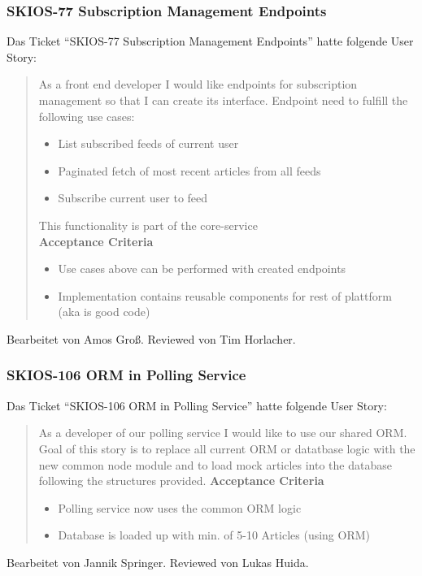 \subsubsection{SKIOS-77 Subscription Management Endpoints}
Das Ticket \enquote{SKIOS-77 Subscription Management Endpoints} hatte folgende User Story:
\begin{quotation}
    As a front end developer I would like endpoints for subscription management so that I can create its interface.
    Endpoint need to fulfill the following use cases:
    \begin{itemize}
        \item List subscribed feeds of current user
        \item Paginated fetch of most recent articles from all feeds
        \item Subscribe current user to feed
    \end{itemize}

    This functionality is part of the core-service \\

\textbf{Acceptance Criteria}
\begin{itemize}
    \item Use cases above can be performed with created endpoints
    \item Implementation contains reusable components for rest of plattform (aka is good code)
\end{itemize}
\end{quotation}
Bearbeitet von Amos Groß.
Reviewed von Tim Horlacher.

\subsubsection{SKIOS-106 ORM in Polling Service}
Das Ticket \enquote{SKIOS-106 ORM in Polling Service} hatte folgende User Story:
\begin{quotation}
    As a developer of our polling service I would like to use our shared ORM.
    Goal of this story is to replace all current ORM or datatbase logic with the new common node module and to load mock articles into the database following the structures provided.
\textbf{Acceptance Criteria}
\begin{itemize}
    \item Polling service now uses the common ORM logic
    \item Database is loaded up with min. of 5-10 Articles (using ORM)
\end{itemize}
\end{quotation}
Bearbeitet von Jannik Springer.
Reviewed von Lukas Huida.

